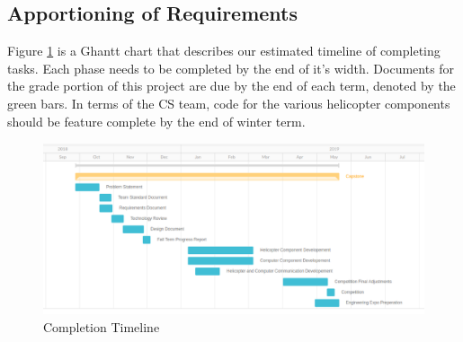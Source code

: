 \documentclass[onecolumn, oneside, letterpaper, draftclsnofoot, 10pt, compsoc]{IEEEtran}
\begin{document}
\subsection{Apportioning of Requirements}
Figure \ref{fig:GanttChart} is a Ghantt chart that describes our estimated timeline of completing tasks. Each phase needs to be completed by the end of it’s width. Documents for the grade portion of this project are due by the end of each term, denoted by the green bars. In terms of the CS team, code for the various helicopter components should be feature complete by the end of winter term.
\begin{figure}[h]
    \centering
    \includegraphics[width=1.0\textwidth]{graphics/gantt_chart.eps}
    \caption{Completion Timeline}
    \label{fig:GanttChart}
\end{figure}
\end{document}
